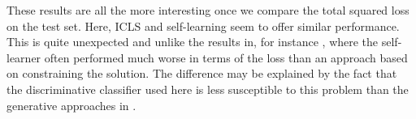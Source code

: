 \documentclass{elsarticle}
\begin{document}


These results are all the more interesting once we compare the total squared loss on the test set. Here, ICLS and self-learning seem to offer similar performance. This is quite unexpected and unlike the results in, for instance \cite{Loog2010,Loog2012a}, where the self-learner  often performed much worse in terms of the loss than an approach based on constraining the solution. The difference may be explained by the fact that the discriminative classifier used here is less susceptible to this problem than the generative approaches in \cite{Loog2010,Loog2012a}.

\end{document}
